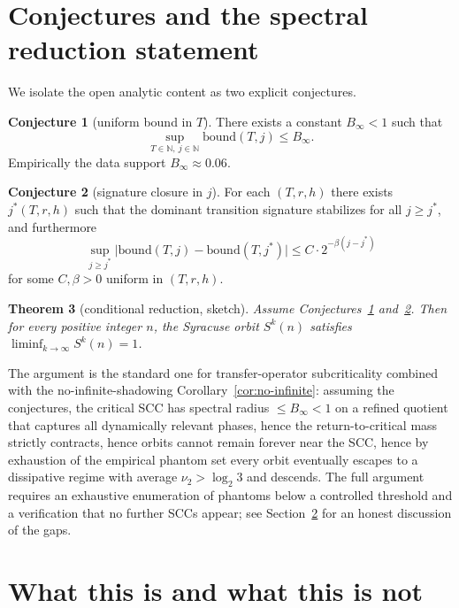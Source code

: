 \documentclass[11pt,a4paper]{article}
\newtheorem{theorem}{Theorem}
\theoremstyle{definition}
\newtheorem{conjecture}[theorem]{Conjecture}
\newcommand{\N}{\mathbb{N}}
\begin{document}
\section{Conjectures and the spectral reduction statement}
\label{sec:reduction}

We isolate the open analytic content as two explicit conjectures.

\begin{conjecture}[uniform bound in $T$]\label{conj:T}
There exists a constant $B_\infty < 1$ such that
\[
\sup_{T \in \N,\ j \in \N} \mathrm{bound}(T, j) \le B_\infty.
\]
Empirically the data support $B_\infty \approx 0.06$.
\end{conjecture}

\begin{conjecture}[signature closure in $j$]\label{conj:j}
For each $(T, r, h)$ there exists $j^*(T, r, h)$ such that the
dominant transition signature stabilizes for all $j \ge j^*$, and
furthermore
\[
\sup_{j \ge j^*}
\bigl|\mathrm{bound}(T, j) - \mathrm{bound}(T, j^*)\bigr|
\le C \cdot 2^{-\beta(j - j^*)}
\]
for some $C, \beta > 0$ uniform in $(T, r, h)$.
\end{conjecture}

\begin{theorem}[conditional reduction, sketch]\label{thm:conditional}
Assume Conjectures~\ref{conj:T} and~\ref{conj:j}. Then for every
positive integer $n$, the Syracuse orbit $S^k(n)$ satisfies
$\liminf_{k\to\infty} S^k(n) = 1$.
\end{theorem}

The argument is the standard one for transfer-operator subcriticality
combined with the no-infinite-shadowing
Corollary~\ref{cor:no-infinite}: assuming the conjectures, the
critical SCC has spectral radius $\le B_\infty < 1$ on a refined
quotient that captures all dynamically relevant phases, hence the
return-to-critical mass strictly contracts, hence orbits cannot
remain forever near the SCC, hence by exhaustion of the empirical
phantom set every orbit eventually escapes to a dissipative regime
with average $\nu_2 > \log_2 3$ and descends. The full argument
requires an exhaustive enumeration of phantoms below a controlled
threshold and a verification that no further SCCs appear; see
Section~\ref{sec:limits} for an honest discussion of the gaps.

\section{What this is and what this is not}
\label{sec:limits}
\end{document}
